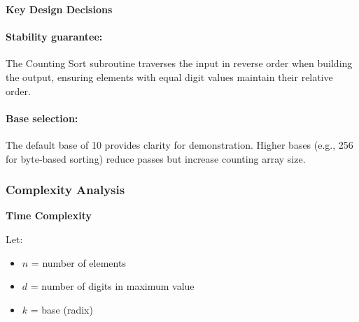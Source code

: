 \documentclass[12pt]{article}
\begin{document}







\newpage
\noindent\textbf{Key Design Decisions}

\paragraph{Stability guarantee:}
The Counting Sort subroutine traverses the input in reverse order when building the output, ensuring elements with equal digit values maintain their relative order.

\paragraph{Base selection:}
The default base of 10 provides clarity for demonstration. Higher bases (e.g., 256 for byte-based sorting) reduce passes but increase counting array size.

\subsubsection{Complexity Analysis}

\textbf{Time Complexity}

Let:
\begin{itemize}
    \item $n$ = number of elements
    \item $d$ = number of digits in maximum value
    \item $k$ = base (radix)
\end{itemize}
\end{document}
